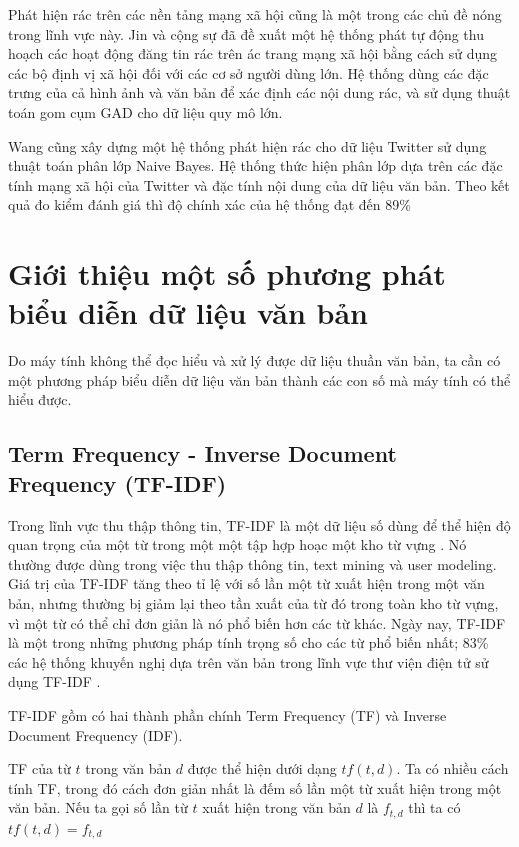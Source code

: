 Phát hiện rác trên các nền tảng mạng xã hội cũng là một trong các chủ đề nóng trong lĩnh vực này. Jin và cộng sự\cite{jin} đã đề xuất một hệ thống phát tự động thu hoạch các hoạt động đăng tin rác trên ác trang mạng xã hội bằng cách sử dụng các bộ định vị xã hội đối với các cơ sở người dùng lớn. Hệ thống dùng các đặc trưng của cả hình ảnh và văn bản để xác định các nội dung rác, và sử dụng thuật toán gom cụm GAD cho dữ liệu quy mô lớn.

Wang cũng xây dựng một hệ thống phát hiện rác cho dữ liệu Twitter sử dụng thuật toán phân lớp Naive Bayes. Hệ thống thức hiện phân lớp dựa trên các đặc tính mạng xã hội của Twitter và đặc tính nội dung của dữ liệu văn bản. Theo kết quả đo kiểm đánh giá thì độ chính xác của hệ thống đạt đến 89\%\cite{5741690}

\section{Giới thiệu một số phương phát biểu diễn dữ liệu văn bản} \label{distances}
Do máy tính không thể đọc hiểu và xử lý được dữ liệu thuần văn bản, ta cần có một phương pháp biểu diễn dữ liệu văn bản thành các con số mà máy tính có thể hiểu được.
\subsection*{Term Frequency - Inverse Document Frequency (TF-IDF)}
Trong lĩnh vực thu thập thông tin, TF-IDF là một dữ liệu số dùng để thể hiện độ quan trọng của một từ trong một một tập hợp hoạc một kho từ vựng \cite{rajaraman_ullman_2011}. Nó thường được dùng trong việc thu thập thông tin, text mining và user modeling. Giá trị của TF-IDF tăng theo tỉ lệ với số lần một từ xuất hiện trong một văn bản, nhưng thường bị giảm lại theo tần xuất của từ đó trong toàn kho từ vựng, vì một từ có thể chỉ đơn giản là nó phổ biến hơn các từ khác. Ngày nay, TF-IDF là một trong những phương pháp tính trọng số cho các từ phổ biến nhất; 83\% các hệ thống khuyến nghị dựa trên văn bản trong lĩnh vực thư viện điện tử sử dụng TF-IDF \cite{Beel2016}.

TF-IDF gồm có hai thành phần chính Term Frequency (TF) và Inverse Document Frequency (IDF).

TF của từ $t$ trong văn bản $d$ được thể hiện dưới dạng $tf(t,d)$. Ta có nhiều cách tính TF, trong đó cách đơn giản nhất là đếm số lần một từ xuất hiện trong một văn bản. Nếu ta gọi số lần từ $t$ xuất hiện trong văn bản $d$ là $f_{t,d}$ thì ta có $tf(t,d) = f_{t,d}$

